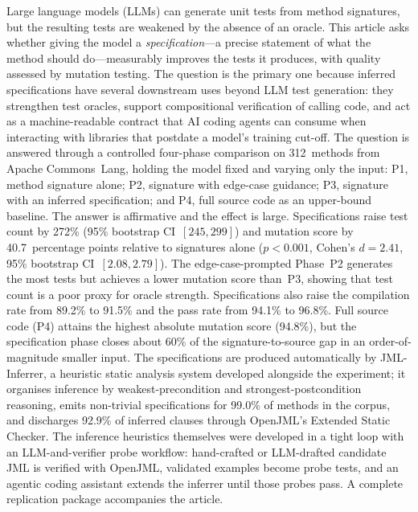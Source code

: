 \documentclass[11pt]{article}
\begin{document}
\noindent Large language models (LLMs) can generate unit tests from method signatures, but the resulting tests are weakened by the absence of an oracle. This article asks whether giving the model a \emph{specification}---a precise statement of what the method should do---measurably improves the tests it produces, with quality assessed by mutation testing. The question is the primary one because inferred specifications have several downstream uses beyond LLM test generation: they strengthen test oracles, support compositional verification of calling code, and act as a machine-readable contract that AI coding agents can consume when interacting with libraries that postdate a model's training cut-off. The question is answered through a controlled four-phase comparison on 312~methods from Apache Commons~Lang, holding the model fixed and varying only the input: P1, method signature alone; P2, signature with edge-case guidance; P3, signature with an inferred specification; and P4, full source code as an upper-bound baseline. The answer is affirmative and the effect is large. Specifications raise test count by 272\% (95\% bootstrap CI~$[245, 299]$) and mutation score by 40.7~percentage points relative to signatures alone ($p < 0.001$, Cohen's $d = 2.41$, 95\% bootstrap CI~$[2.08, 2.79]$). The edge-case-prompted Phase~P2 generates the most tests but achieves a lower mutation score than~P3, showing that test count is a poor proxy for oracle strength. Specifications also raise the compilation rate from 89.2\% to 91.5\% and the pass rate from 94.1\% to 96.8\%. Full source code (P4) attains the highest absolute mutation score (94.8\%), but the specification phase closes about 60\% of the signature-to-source gap in an order-of-magnitude smaller input. The specifications are produced automatically by JML-Inferrer, a heuristic static analysis system developed alongside the experiment; it organises inference by weakest-precondition and strongest-postcondition reasoning, emits non-trivial specifications for 99.0\% of methods in the corpus, and discharges 92.9\% of inferred clauses through OpenJML's Extended Static Checker. The inference heuristics themselves were developed in a tight loop with an LLM-and-verifier probe workflow: hand-crafted or LLM-drafted candidate JML is verified with OpenJML, validated examples become probe tests, and an agentic coding assistant extends the inferrer until those probes pass. A complete replication package accompanies the article.

\vspace{1em}
\end{document}
